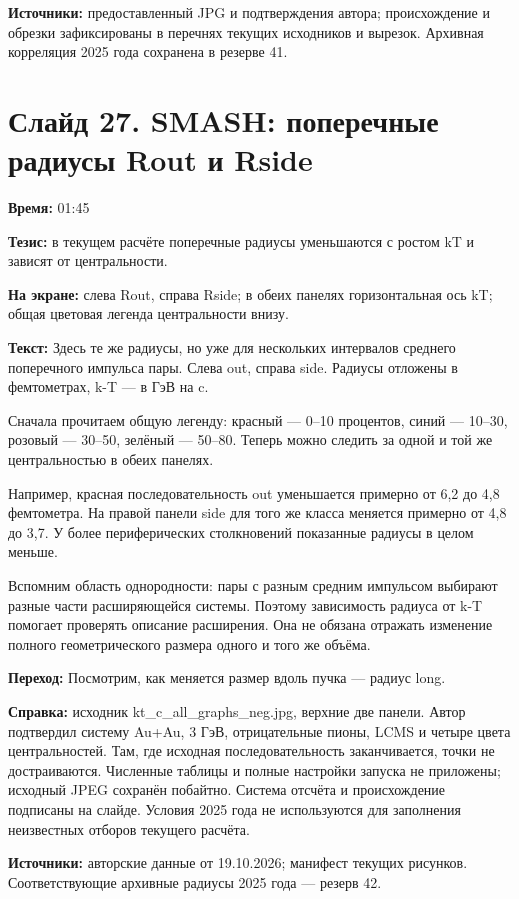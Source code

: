 \documentclass[11pt,a4paper]{article}
\begin{document}
\textbf{Источники:} предоставленный JPG и подтверждения автора; происхождение и обрезки зафиксированы в перечнях текущих исходников и вырезок. Архивная корреляция 2025 года сохранена в резерве 41.

\clearpage
\section*{Слайд 27. SMASH: поперечные радиусы Rout и Rside}
\textbf{Время:} 01:45

\textbf{Тезис:} в текущем расчёте поперечные радиусы уменьшаются с ростом kT и зависят от центральности.

\textbf{На экране:} слева Rout, справа Rside; в обеих панелях горизонтальная ось kT; общая цветовая легенда центральности внизу.

\textbf{Текст:} Здесь те же радиусы, но уже для нескольких интервалов среднего поперечного импульса пары. Слева out, справа side. Радиусы отложены в фемтометрах, k-T — в ГэВ на c.

Сначала прочитаем общую легенду: красный — 0–10 процентов, синий — 10–30, розовый — 30–50, зелёный — 50–80. Теперь можно следить за одной и той же центральностью в обеих панелях.

Например, красная последовательность out уменьшается примерно от 6,2 до 4,8 фемтометра. На правой панели side для того же класса меняется примерно от 4,8 до 3,7. У более периферических столкновений показанные радиусы в целом меньше.

Вспомним область однородности: пары с разным средним импульсом выбирают разные части расширяющейся системы. Поэтому зависимость радиуса от k-T помогает проверять описание расширения. Она не обязана отражать изменение полного геометрического размера одного и того же объёма.

\textbf{Переход:} Посмотрим, как меняется размер вдоль пучка — радиус long.

\textbf{Справка:} исходник kt\_c\_all\_graphs\_neg.jpg, верхние две панели. Автор подтвердил систему Au+Au, 3 ГэВ, отрицательные пионы, LCMS и четыре цвета центральностей. Там, где исходная последовательность заканчивается, точки не достраиваются. Численные таблицы и полные настройки запуска не приложены; исходный JPEG сохранён побайтно. Система отсчёта и происхождение подписаны на слайде. Условия 2025 года не используются для заполнения неизвестных отборов текущего расчёта.

\textbf{Источники:} авторские данные от 19.10.2026; манифест текущих рисунков. Соответствующие архивные радиусы 2025 года — резерв 42.
\end{document}
